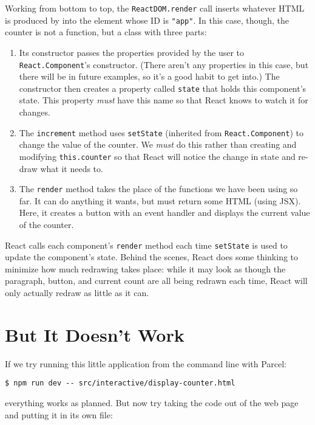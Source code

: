 Working from bottom to top,
the \texttt{ReactDOM.render} call inserts whatever HTML is produced by \texttt{}
into the element whose ID is \texttt{"app"}.
In this case,
though,
the counter is not a function,
but a class with three parts:

\begin{enumerate}
\item
  Its constructor passes the properties provided by the user to \texttt{React.Component}'s constructor.
  (There aren't any properties in this case,
  but there will be in future examples,
  so it's a good habit to get into.)
  The constructor then creates a property called \texttt{state}
  that holds this component's state.
  This property \emph{must} have this name so that React knows to watch it for changes.
\item
  The \texttt{increment} method uses \texttt{setState} (inherited from \texttt{React.Component})
  to change the value of the counter.
  We \emph{must} do this rather than creating and modifying \texttt{this.counter}
  so that React will notice the change in state
  and re-draw what it needs to.
\item
  The \texttt{render} method takes the place of the functions we have been using so far.
  It can do anything it wants, but must return some HTML (using JSX).
  Here, it creates a button with an event handler and displays the current value of the counter.
\end{enumerate}

React calls each component's \texttt{render} method each time \texttt{setState} is used to update the component's state.
Behind the scenes,
React does some thinking to minimize how much redrawing takes place:
while it may look as though the paragraph, button, and current count are all being redrawn each time,
React will only actually redraw as little as it can.

\section{But It Doesn't Work}\label{s:interactive-babel}

If we try running this little application from the command line with Parcel:

\begin{verbatim}
$ npm run dev -- src/interactive/display-counter.html
\end{verbatim}

\noindent
everything works as planned.
But now try taking the code out of the web page and putting it in its own file:

